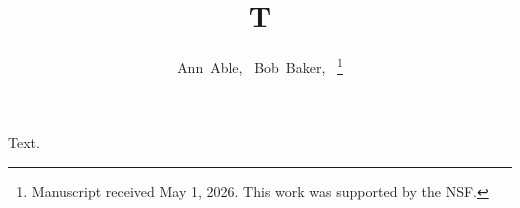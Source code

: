 \documentclass[journal]{IEEEtran}
\begin{document}
\title{T}
\author{Ann~Able,~
        Bob~Baker,~%
\thanks{Manuscript received May 1, 2026. This work was supported by the NSF.}}
\maketitle
Text.
\end{document}
